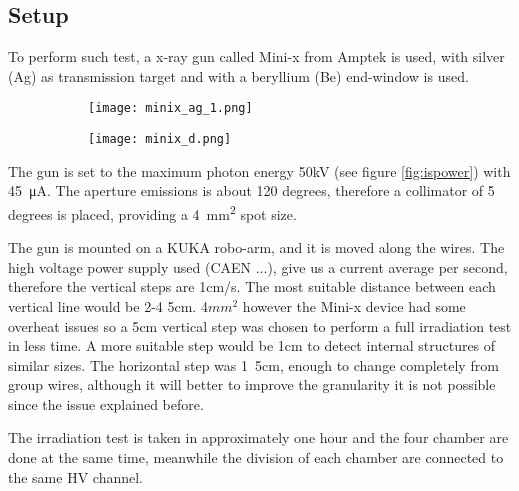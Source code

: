 \subsection{Setup}
To perform such test, a x-ray gun called Mini-x from Amptek is used, with silver (Ag) as transmission target and with a
beryllium (Be) end-window is used.\par

\begin{figure}
	\centering
	\hspace*{\fill}
	{\begin{subfigure}[b]{0.4\textwidth}
	\centering
	\texttt{[image: minix\_ag\_1.png]}
	\caption{}\label{fig:minixgun}
	\end{subfigure}
	}
	\hfill
	{
	\begin{subfigure}[b]{0.4\textwidth}
	\centering
	\texttt{[image: minix\_d.png]}
	\caption{}\label{}
	\end{subfigure}
	}
	\hspace*{\fill}
\end{figure}

The gun is set to the maximum photon energy 50kV (see figure \ref{fig:ispower}) with \SI{45}{\micro A}.
The aperture emissions is about 120 degrees, therefore a
collimator of 5 degrees is placed, providing a \SI{4}{mm^2} spot size.\par
The gun is mounted on a KUKA robo-arm, and it is moved along the wires.
The high voltage power supply used (CAEN ...), give us a current average
per second, therefore the vertical steps are 1cm/s. The most suitable distance between each vertical line would be 2-4 5cm. 4$mm^2$ however the Mini-x device
had some overheat issues so a \unit{5}{cm} vertical step was chosen to perform a full irradiation test in less time. A
more suitable step would be \unit{1}{cm} to detect internal structures of similar sizes. The horizontal step was
\unit{1.5}{cm}, enough to change completely from group wires, although it will better to improve the granularity it is
not possible since the issue explained before.



The irradiation test is taken in approximately one hour and the four chamber are done at the same time, meanwhile the
division of each chamber are connected to the same HV channel. 




